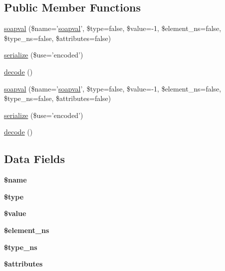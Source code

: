 \subsection*{Public Member Functions}
\begin{DoxyCompactItemize}
\item 
\hyperlink{classsoapval_a03fb2cf9de082b67bf1193ab47f60a75}{soapval} (\$name='\hyperlink{classsoapval}{soapval}', \$type=false, \$value=-\/1, \$element\-\_\-ns=false, \$type\-\_\-ns=false, \$attributes=false)
\item 
\hyperlink{classsoapval_abd6b085523c68ec1e7c6f3690ad68062}{serialize} (\$use='encoded')
\item 
\hyperlink{classsoapval_a9a65d563b072e1f019552eaa399e98f3}{decode} ()
\item 
\hyperlink{classsoapval_a03fb2cf9de082b67bf1193ab47f60a75}{soapval} (\$name='\hyperlink{classsoapval}{soapval}', \$type=false, \$value=-\/1, \$element\-\_\-ns=false, \$type\-\_\-ns=false, \$attributes=false)
\item 
\hyperlink{classsoapval_abd6b085523c68ec1e7c6f3690ad68062}{serialize} (\$use='encoded')
\item 
\hyperlink{classsoapval_a9a65d563b072e1f019552eaa399e98f3}{decode} ()
\end{DoxyCompactItemize}
\subsection*{Data Fields}
\begin{DoxyCompactItemize}
\item 
\hypertarget{classsoapval_ab2fc40d43824ea3e1ce5d86dee0d763b}{{\bfseries \$name}}\label{classsoapval_ab2fc40d43824ea3e1ce5d86dee0d763b}

\item 
\hypertarget{classsoapval_a9a4a6fba2208984cabb3afacadf33919}{{\bfseries \$type}}\label{classsoapval_a9a4a6fba2208984cabb3afacadf33919}

\item 
\hypertarget{classsoapval_a0f298096f322952a72a50f98a74c7b60}{{\bfseries \$value}}\label{classsoapval_a0f298096f322952a72a50f98a74c7b60}

\item 
\hypertarget{classsoapval_a04cba769bc1831fc7cd204c05a0f7875}{{\bfseries \$element\-\_\-ns}}\label{classsoapval_a04cba769bc1831fc7cd204c05a0f7875}

\item 
\hypertarget{classsoapval_a8595956048ac26a31428d576a6efbb6d}{{\bfseries \$type\-\_\-ns}}\label{classsoapval_a8595956048ac26a31428d576a6efbb6d}

\item 
\hypertarget{classsoapval_adc851f7a62250e75df0490c0280aef4c}{{\bfseries \$attributes}}\label{classsoapval_adc851f7a62250e75df0490c0280aef4c}

\end{DoxyCompactItemize}


